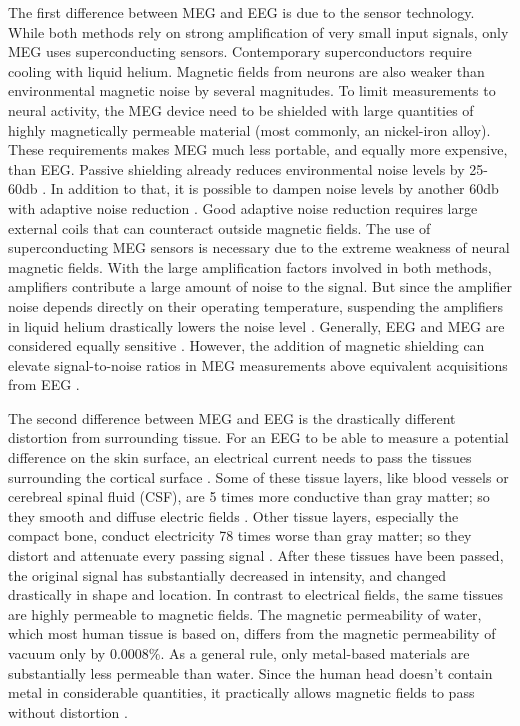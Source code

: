 The first difference between MEG and EEG is due to the sensor technology.
While both methods rely on strong amplification of very small input signals, only MEG uses superconducting sensors.
Contemporary superconductors require cooling with liquid helium.
Magnetic fields from neurons are also weaker than environmental magnetic noise by several magnitudes.
To limit measurements to neural activity, the MEG device need to be shielded with large quantities of highly magnetically permeable material (most commonly, an nickel-iron alloy).
These requirements makes MEG much less portable, and equally more expensive, than EEG.
Passive shielding already reduces environmental noise levels by 25-60db \cite{1.5.SNR}.
In addition to that, it is possible to dampen noise levels by another 60db with adaptive noise reduction \cite{1.5.SNR}.
Good adaptive noise reduction requires large external coils that can counteract outside magnetic fields.
The use of superconducting MEG sensors is necessary due to the extreme weakness of neural magnetic fields.
With the large amplification factors involved in both methods, amplifiers contribute a large amount of noise to the signal.
But since the amplifier noise depends directly on their operating temperature, suspending the amplifiers in liquid helium drastically lowers the noise level \cite{1.5.MEG.a}.
Generally, EEG and MEG are considered equally sensitive \cite{1.5.MEG.a}\cite{1.5.MEG.c}.
However, the addition of magnetic shielding can elevate signal-to-noise ratios in MEG measurements above equivalent acquisitions from EEG \cite{1.5.SNR}.

The second difference between MEG and EEG is the drastically different distortion from surrounding tissue.
For an EEG to be able to measure a potential difference on the skin surface, an electrical current needs to pass the tissues surrounding the cortical surface \cite{1.5.tissues.b}.
Some of these tissue layers, like blood vessels or cerebreal spinal fluid (CSF), are 5 times more conductive than gray matter; so they smooth and diffuse electric fields \cite{1.5.tissues.a}\cite{1.5.tissues.b}.
Other tissue layers, especially the compact bone, conduct electricity 78 times worse than gray matter; so they distort and attenuate every passing signal \cite{1.5.tissues.a}.
After these tissues have been passed, the original signal has substantially decreased in intensity, and changed drastically in shape and location.
In contrast to electrical fields, the same tissues are highly permeable to magnetic fields.
The magnetic permeability of water, which most human tissue is based on, differs from the magnetic permeability of vacuum only by 0.0008\%.
As a general rule, only metal-based materials are substantially less permeable than water.
Since the human head doesn't contain metal in considerable quantities, it practically allows magnetic fields to pass without distortion \cite{1.5.tissues.a}.

